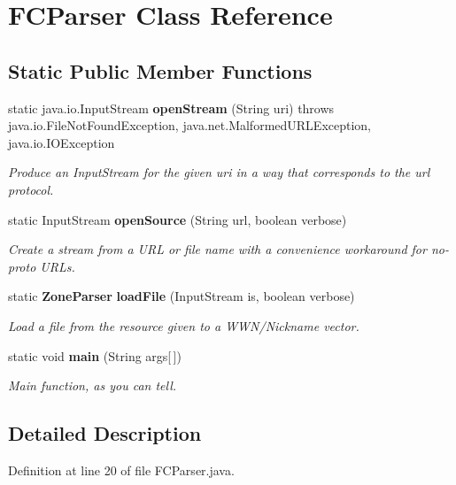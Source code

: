 \section{F\-C\-Parser Class Reference}
\label{classorg_1_1smallfoot_1_1parser_1_1FCParser}
\subsection*{Static Public Member Functions}
\begin{DoxyCompactItemize}
\item 
static java.\-io.\-Input\-Stream {\bf open\-Stream} (String uri)  throws java.\-io.\-File\-Not\-Found\-Exception, java.\-net.\-Malformed\-U\-R\-L\-Exception, java.\-io.\-I\-O\-Exception     
\begin{DoxyCompactList}\small\item\em Produce an Input\-Stream for the given uri in a way that corresponds to the url protocol. \end{DoxyCompactList}\item 
static Input\-Stream {\bf open\-Source} (String url, boolean verbose)
\begin{DoxyCompactList}\small\item\em Create a stream from a U\-R\-L or file name with a convenience workaround for no-\/proto U\-R\-Ls. \end{DoxyCompactList}\item 
static {\bf Zone\-Parser} {\bf load\-File} (Input\-Stream is, boolean verbose)
\begin{DoxyCompactList}\small\item\em Load a file from the resource given to a W\-W\-N/\-Nickname vector. \end{DoxyCompactList}\item 
static void {\bf main} (String args[$\,$])
\begin{DoxyCompactList}\small\item\em Main function, as you can tell. \end{DoxyCompactList}\end{DoxyCompactItemize}


\subsection{Detailed Description}


Definition at line 20 of file F\-C\-Parser.\-java.



